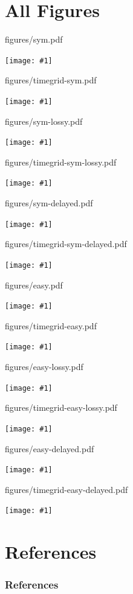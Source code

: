 \documentclass{beamer}
\newcommand{\TitledFigureSlide}[2]{
  \begin{frame}{#1}
    \begin{centering}
      \vfill
      \texttt{[image: \#1]}
      \vfill
      \end{centering}
  \end{frame}
}
\begin{document}
\appendix %

\section{All Figures}
\TitledFigureSlide{figures/sym.pdf}{Throughput Comparison, Symmetric}
\TitledFigureSlide{figures/timegrid-sym.pdf}{Timelapse, Symmetric}

\TitledFigureSlide{figures/sym-lossy.pdf}{Throughput Comparison, Symmetric with Loss}
\TitledFigureSlide{figures/timegrid-sym-lossy.pdf}{Timelapse, Symmetric with Loss}

\TitledFigureSlide{figures/sym-delayed.pdf}{Throughput Comparison, Symmetric with Delay}
\TitledFigureSlide{figures/timegrid-sym-delayed.pdf}{Timelapse, Symmetric with Delay}


\TitledFigureSlide{figures/easy.pdf}{Throughput Comparison, Core-limited}
\TitledFigureSlide{figures/timegrid-easy.pdf}{Timelapse, Core-limited}

\TitledFigureSlide{figures/easy-lossy.pdf}{Throughput Comparison, Core-limited with Loss}
\TitledFigureSlide{figures/timegrid-easy-lossy.pdf}{Timelapse, Core-limited with Loss}

\TitledFigureSlide{figures/easy-delayed.pdf}{Throughput Comparison, Core-limited with Delay}
\TitledFigureSlide{figures/timegrid-easy-delayed.pdf}{Timelapse, Core-limited with Delay}

\section{References}
\begin{frame}[allowframebreaks]
  \frametitle{References}
  
  
\end{frame}
\end{document}
